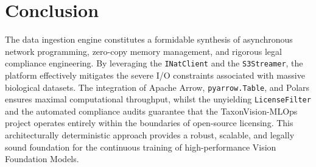 \section{Conclusion}
The data ingestion engine constitutes a formidable synthesis of asynchronous network programming, zero-copy memory management, and rigorous legal compliance engineering. By leveraging the \texttt{INatClient} and the \texttt{S3Streamer}, the platform effectively mitigates the severe I/O constraints associated with massive biological datasets. The integration of Apache Arrow, \texttt{pyarrow.Table}, and Polars ensures maximal computational throughput, whilst the unyielding \texttt{LicenseFilter} and the automated compliance audits guarantee that the TaxonVision-MLOps project operates entirely within the boundaries of open-source licensing. This architecturally deterministic approach provides a robust, scalable, and legally sound foundation for the continuous training of high-performance Vision Foundation Models.
